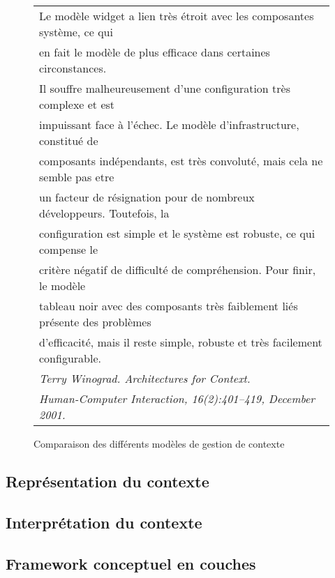 \begin{figure}[h]
  \centering
  \begin{tabular}{l}
    Le modèle widget a lien très étroit avec les composantes système, ce qui \\
    en fait le modèle de plus efficace dans certaines circonstances. \\
    Il souffre malheureusement d'une configuration très complexe et est \\
    impuissant face à l'échec. Le modèle d'infrastructure, constitué de \\
    composants indépendants, est très convoluté, mais cela ne semble pas etre \\
    un facteur de résignation pour de nombreux développeurs. Toutefois, la \\
    configuration est simple et le système est robuste, ce qui compense le \\
    critère négatif de difficulté de compréhension. Pour finir, le modèle \\
    tableau noir avec des composants très faiblement liés présente des problèmes \\
    d'efficacité, mais il reste simple, robuste et très facilement configurable.
    \cite{winograd_architectures_2001} \\
    \em \footnotesize Terry Winograd. Architectures for Context. \\
    \em \footnotesize Human-Computer Interaction, 16(2):401–419,
     December 2001. \\
  \end{tabular}
  \caption{Comparaison des différents modèles de gestion de contexte}
  \label{fig:quote}
\end{figure}
\begin{quotation}
\end{quotation}

\subsection{Représentation du contexte}

\subsection{Interprétation du contexte}

\subsection{Framework conceptuel en couches}

